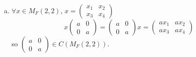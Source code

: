 \begin{answer}
    \begin{enumerate}[(a)]
        \item $\forall x\in M_{F}(2,2)$, $x=\begin{pmatrix}
            x_{1}&x_{2}\\x_{3}&x_{4}
        \end{pmatrix}$\[x\begin{pmatrix}
            a&0\\0&a
        \end{pmatrix}=\begin{pmatrix}
            a&0\\0&a
        \end{pmatrix}x=\begin{pmatrix}
            ax_{1}&ax_{2}\\ax_{3}&ax_{4}
        \end{pmatrix}\] so $\begin{pmatrix}
            a&0\\0&a
        \end{pmatrix}\in C(M_{F}(2,2))$.


\end{enumerate}
\end{answer}
